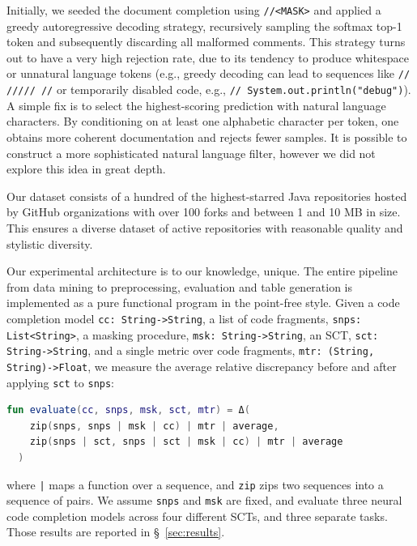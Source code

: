 \documentclass[usenames,dvipsnames]{article} %
\begin{document}
Initially, we seeded the document completion using \lstinline|//<MASK>| and applied a greedy autoregressive decoding strategy, recursively sampling the softmax top-1 token and subsequently discarding all malformed comments. This strategy turns out to have a very high rejection rate, due to its tendency to produce whitespace or unnatural language tokens (e.g., greedy decoding can lead to sequences like \lstinline|// ///// //| or temporarily disabled code, e.g., \lstinline|// System.out.println("debug")|). A simple fix is to select the highest-scoring prediction with natural language characters. By conditioning on at least one alphabetic character per token, one obtains more coherent documentation and rejects fewer samples. It is possible to construct a more sophisticated natural language filter, however we did not explore this idea in great depth.

  Our dataset consists of a hundred of the highest-starred Java repositories hosted by GitHub organizations with over 100 forks and between 1 and 10 MB in size. This ensures a diverse dataset of active repositories with reasonable quality and stylistic diversity.

  Our experimental architecture is to our knowledge, unique. The entire pipeline from data mining to preprocessing, evaluation and table generation is implemented as a pure functional program in the point-free style. Given a code completion model \lstinline|cc: String->String|, a list of code fragments, \lstinline|snps: List<String>|, a masking procedure, \lstinline|msk: String->String|, an SCT, \lstinline|sct: String->String|, and a single metric over code fragments, \lstinline|mtr: (String, String)->Float|, we measure the average relative discrepancy before and after applying \lstinline|sct| to \lstinline|snps|:

  \noindent\begin{lstlisting}[basicstyle=\footnotesize\ttfamily, language=kotlin,label={lst:lstlisting}]
  fun evaluate(cc, snps, msk, sct, mtr) = Δ(
    zip(snps, snps | msk | cc) | mtr | average,
    zip(snps | sct, snps | sct | msk | cc) | mtr | average
  )
  \end{lstlisting}

  \noindent where \texttt{|} maps a function over a sequence, and \lstinline|zip| zips two sequences into a sequence of pairs. We assume \lstinline|snps| and \lstinline|msk| are fixed, and evaluate three neural code completion models across four different SCTs, and three separate tasks. Those results are reported in \S~\ref{sec:results}.
\end{document}
